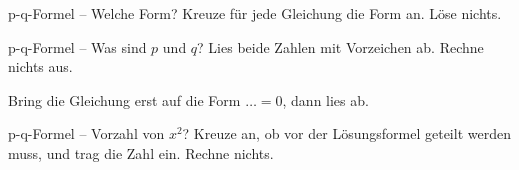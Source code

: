 \setcounter{aufgabe}{16}
\hypertarget{e3}{}

\begin{aufgabe}{p-q-Formel -- Welche Form? Kreuze für jede Gleichung die Form an.
Löse nichts.}

\end{aufgabe}

\begin{aufgabe}{p-q-Formel -- Was sind $p$ und $q$? Lies beide Zahlen mit Vorzeichen
ab. Rechne nichts aus.}
\begin{geruest}
\end{geruest}
Bring die Gleichung erst auf die Form $\ldots = 0$, dann lies ab.
\begin{geruest}
\end{geruest}
\end{aufgabe}

\begin{aufgabe}{p-q-Formel -- Vorzahl von $x^2$? Kreuze an, ob vor der Lösungsformel
geteilt werden muss, und trag die Zahl ein. Rechne nichts.}
\begin{geruest}
\end{geruest}
\end{aufgabe}

